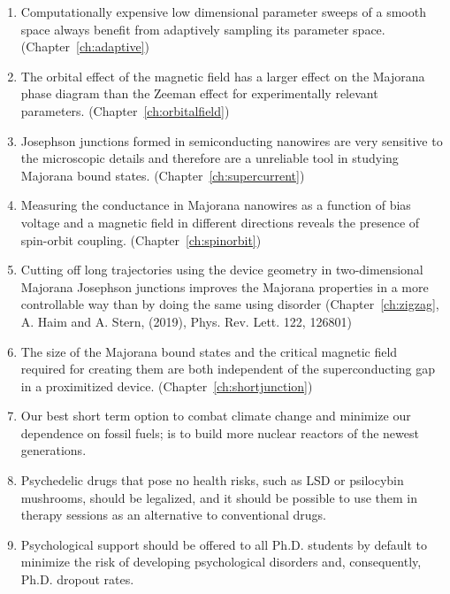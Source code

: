 \documentclass{dissertation}
\begin{document}
\begin{enumerate}

\item Computationally expensive low dimensional parameter sweeps of a smooth space always benefit from adaptively sampling its parameter space. (Chapter~\ref{ch:adaptive})

\item The orbital effect of the magnetic field has a larger effect on the Majorana phase diagram than the Zeeman effect for experimentally relevant parameters. (Chapter~\ref{ch:orbitalfield})

\item Josephson junctions formed in semiconducting nanowires are very sensitive to the microscopic details and therefore are a unreliable tool in studying Majorana bound states. (Chapter~\ref{ch:supercurrent})

\item Measuring the conductance in Majorana nanowires as a function of bias voltage and a magnetic field in different directions reveals the presence of spin-orbit coupling. (Chapter~\ref{ch:spinorbit})

\item Cutting off long trajectories using the device geometry in two-dimensional Majorana Josephson junctions improves the Majorana properties in a more controllable way than by doing the same using disorder (Chapter~\ref{ch:zigzag}, A. Haim and A. Stern, (2019), Phys. Rev. Lett. 122, 126801)

\item The size of the Majorana bound states and the critical magnetic field required for creating them are both independent of the superconducting gap in a proximitized device. (Chapter~\ref{ch:shortjunction})

\item Our best short term option to combat climate change and minimize our dependence on fossil fuels; is to build more nuclear reactors of the newest generations.

\item Psychedelic drugs that pose no health risks, such as LSD or psilocybin mushrooms, should be legalized, and it should be possible to use them in therapy sessions as an alternative to conventional drugs.

\item Psychological support should be offered to all Ph.D. students by default to minimize the risk of developing psychological disorders and, consequently, Ph.D. dropout rates.


\end{enumerate}
\end{document}

